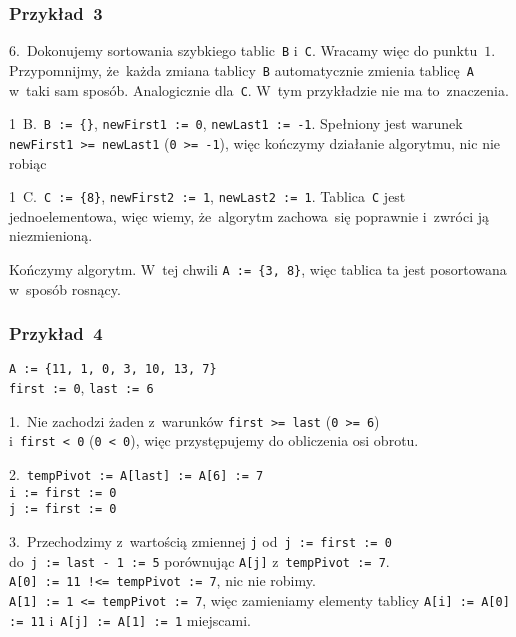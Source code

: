 \documentclass[10pt,t]{beamer}
\begin{document}
\begin{frame}
  \frametitle{Przykład~3}


  6.~Dokonujemy sortowania szybkiego tablic~\texttt{B} i~\texttt{C}. Wracamy
  więc do punktu~$1$. Przypomnijmy, że~każda zmiana tablicy~\texttt{B}
  automatycznie zmienia tablicę~\texttt{A} w~taki sam sposób. Analogicznie
  dla~\texttt{C}. W~tym przykładzie nie ma to~znaczenia.

  1~B.~\texttt{B := \{\}}, \texttt{newFirst1 := 0},
  \texttt{newLast1 := -1}. Spełniony jest warunek
  \texttt{newFirst1 >= newLast1} (\texttt{0 >= -1}), więc kończymy działanie
  algorytmu, nic nie robiąc

  1~C.~\texttt{C := \{8\}}, \texttt{newFirst2 := 1},
  \texttt{newLast2 := 1}. Tablica~\texttt{C} jest jednoelementowa, więc
  wiemy, że~algorytm zachowa~się poprawnie i~zwróci ją niezmienioną.

  Kończymy algorytm. W~tej chwili \texttt{A := \{3, 8\}}, więc tablica ta
  jest posortowana w~sposób rosnący.

\end{frame}





\begin{frame}
  \frametitle{Przykład~4}


  \texttt{A := \{11, 1, 0, 3, 10, 13, 7\} } \\
  \texttt{first := 0}, \texttt{last := 6}

  1.~Nie zachodzi żaden z~warunków \texttt{first >= last}
  (\texttt{0 >= 6}) \\
  i~\texttt{first < 0} (\texttt{0 < 0}), więc przystępujemy do obliczenia
  osi obrotu.

  2.~\texttt{tempPivot := A[last] := A[6] := 7} \\
  \texttt{i := first := 0} \\
  \texttt{j := first := 0}

  3.~Przechodzimy z~wartością zmiennej \texttt{j}
  od~\texttt{j := first := 0} \\
  do~\texttt{j := last - 1 := 5} porównując \texttt{A[j]}
  z~\texttt{tempPivot := 7}. \\
  \texttt{A[0] := 11 !<= tempPivot := 7}, nic nie robimy. \\
  \texttt{A[1] := 1 <= tempPivot := 7}, więc zamieniamy elementy tablicy
  \texttt{A[i] := A[0] := 11} i~\texttt{A[j] := A[1] := 1} miejscami.

\end{frame}
\end{document}

